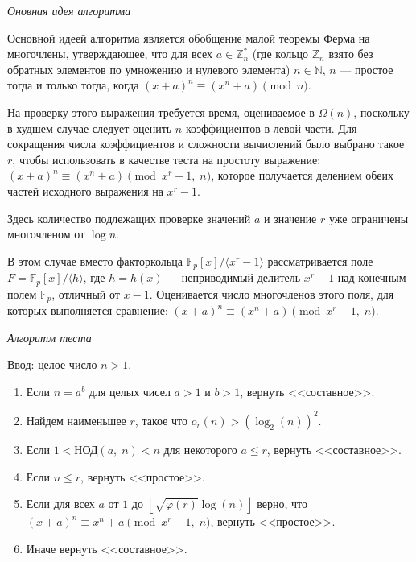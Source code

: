 \documentclass[bachelor, och, labwork]{shiza}
\begin{document}
\begin{center}
    \textit{Оновная идея алгоритма}
\end{center}

Основной идеей алгоритма является обобщение малой теоремы Ферма на многочлены, 
утверждающее, что для всех $a\in \mathbb {Z} _{n}^{*}$ (где кольцо 
$\mathbb {Z} _{n}$ взято без обратных элементов по умножению и нулевого элемента)
$n\in \mathbb {N}$, $n$ --- простое тогда и только тогда, когда 
$(x+a)^{n}\equiv (x^{n}+a){\pmod {n}}$.

На проверку этого выражения требуется время, оцениваемое в $\Omega (n)$, поскольку 
в худшем случае следует оценить $n$ коэффициентов в левой части. Для сокращения 
числа коэффициентов и сложности вычислений было выбрано такое $r$, чтобы 
использовать в качестве теста на простоту выражение: $(x+a)^{n}\equiv (x^{n}+a){\pmod {x^{r}-1,\;n}}$,
которое получается делением обеих частей исходного выражения на $x^{r}-1$.

Здесь количество подлежащих проверке значений $a$ и значение $r$ уже ограничены
многочленом от $\log n$.

В этом случае вместо факторкольца $\mathbb {F} _{p}[x]/\langle x^{r}-1\rangle$ 
рассматривается поле $F=\mathbb {F} _{p}[x]/\langle h\rangle$, где $h=h(x)$ --- 
неприводимый делитель ${x^{r}-1}$ над конечным полем $\mathbb {F} _{p}$, отличный 
от $x-1$. Оценивается число многочленов этого поля, для которых выполняется сравнение:
$(x+a)^{n}\equiv (x^{n}+a){\pmod {x^{r}-1,\;n}}.$

\begin{center}
    \textit{Алгоритм теста}
\end{center}

Ввод: целое число $n>1$.

\begin{enumerate}
    \item Если $n=a^{b}$ для целых чисел $a>1$ и $b>1$, вернуть <<составное>>.
    \item Найдем наименьшее $r$, такое что $o_{r}(n)>(\log _{2}(n))^{2}$.
    \item Если $1<$НОД$(a,\;n)<n$ для некоторого $a\leqslant r$, вернуть <<составное>>.
    \item Если $n\leqslant r$, вернуть <<простое>>.
    \item Если для всех $a$ от $1$ до $\left\lfloor {\sqrt {\varphi (r)}}\log(n)\right\rfloor$ 
    верно, что $(x+a)^{n}\equiv x^{n}+a{\pmod {x^{r}-1,\;n}}$, вернуть <<простое>>.
    \item Иначе вернуть <<составное>>.
\end{enumerate}
\end{document}
